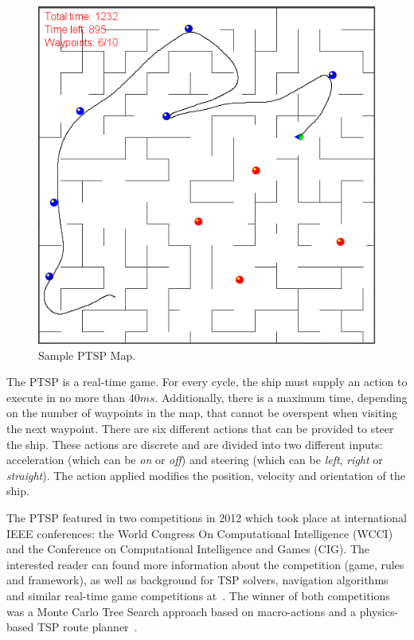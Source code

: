 \documentclass{sig-alternate}
\begin{document}
\begin{figure} [!t]
	\begin{center}
	\includegraphics[scale=0.35]{img/ptspMap}
	\caption{Sample PTSP Map.}
	\label{fig:map}
	\end{center}
\end{figure}

The PTSP is a real-time game. For every cycle, the ship must supply an action to execute in no more than $40ms$. Additionally, there is a maximum time, depending on the number of waypoints in the map, that cannot be overspent when visiting the next waypoint. There are six different actions that can be provided to steer the ship. These actions are discrete and are divided into two different inputs: acceleration (which can be \textit{on} or \textit{off}) and steering (which can be \textit{left}, \textit{right} or \textit{straight}). The action applied modifies the position, velocity and orientation of the ship. 

The PTSP featured in two competitions in 2012 which took place at international IEEE conferences: the World Congress On Computational Intelligence (WCCI) and the Conference on Computational Intelligence and Games (CIG). The interested reader can found more information about the competition (game, rules and framework), as well as background for TSP solvers, navigation algorithms and similar real-time game competitions at~\cite{Perez2012}. The winner of both competitions was a Monte Carlo Tree Search approach based on macro-actions and a physics-based TSP route planner~\cite{Powley2012}. 
\end{document}
